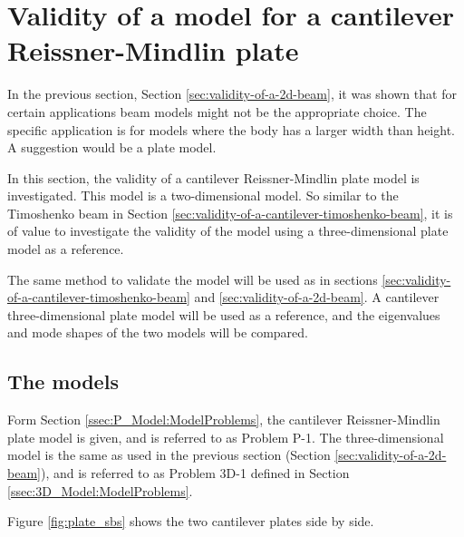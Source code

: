 \documentclass[../../main.tex]{subfiles}
\begin{document}
\section{Validity of a model for a cantilever Reissner-Mindlin plate} \label{sec:validity-of-a-plate}

In the previous section, Section \ref{sec:validity-of-a-2d-beam}, it was shown that for certain applications beam models might not be the appropriate choice. The specific application is for models where the body has a larger width than height. A suggestion would be a plate model.

In this section, the validity of a cantilever Reissner-Mindlin plate model is investigated. This model is a two-dimensional model. So similar to the Timoshenko beam in Section \ref{sec:validity-of-a-cantilever-timoshenko-beam}, it is of value to investigate the validity of the model using a three-dimensional plate model as a reference.

The same method to validate the model will be used as in sections \ref{sec:validity-of-a-cantilever-timoshenko-beam} and \ref{sec:validity-of-a-2d-beam}. A cantilever three-dimensional plate model will be used as a reference, and the eigenvalues and mode shapes of the two models will be compared.

\subsection{The models}
Form Section \ref{ssec:P_Model:ModelProblems}, the cantilever Reissner-Mindlin plate model is given, and is referred to as Problem P-1. The three-dimensional model is the same as used in the previous section (Section \ref{sec:validity-of-a-2d-beam}), and is referred to as Problem 3D-1 defined in Section \ref{ssec:3D_Model:ModelProblems}.

Figure \ref{fig:plate_sbs} shows the two cantilever plates side by side.
\end{document}
